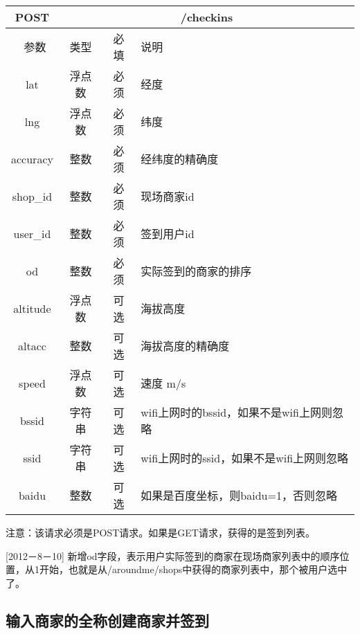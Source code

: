 \documentclass[cs4size]{ctexartutf8}
\begin{document}
\begin{table}[H]
   \begin{center}
\begin{tabular}{|c|c|c|p{12cm}|}
\hline
POST & \multicolumn{3}{|c|}{/checkins} \\
\hline\hline
 \  参数  & 类型 & 必填 &  说明  \\
\hline
 lat  & 浮点数 & 必须 & 经度\\
\hline
 lng  &  浮点数 & 必须 & 纬度\\ 
\hline
 accuracy  & 整数 & 必须 & 经纬度的精确度\\ 
\hline
 shop\_id  & 整数 & 必须 &  现场商家id\\ 
\hline
 user\_id  & 整数 & 必须 &  签到用户id\\ 
\hline
 od  & 整数 & 必须 &  实际签到的商家的排序\\  
\hline
 altitude  &  浮点数 & 可选 & 海拔高度\\ 
\hline
 altacc  & 整数 & 可选 & 海拔高度的精确度\\  
\hline
 speed  & 浮点数 & 可选 & 速度 m/s\\   
\hline
 bssid  & 字符串 & 可选 & wifi上网时的bssid，如果不是wifi上网则忽略\\  
\hline
 ssid  & 字符串 & 可选 & wifi上网时的ssid，如果不是wifi上网则忽略\\  
\hline
 baidu  & 整数 & 可选 & 如果是百度坐标，则baidu=1，否则忽略\\  
\hline
\end{tabular}
   \end{center}
\end{table}

注意：该请求必须是POST请求。如果是GET请求，获得的是签到列表。

[2012－8－10] 新增od字段，表示用户实际签到的商家在现场商家列表中的顺序位置，从1开始，也就是从/aroundme/shops中获得的商家列表中，那个被用户选中了。



\subsection{输入商家的全称创建商家并签到}
\end{document}
